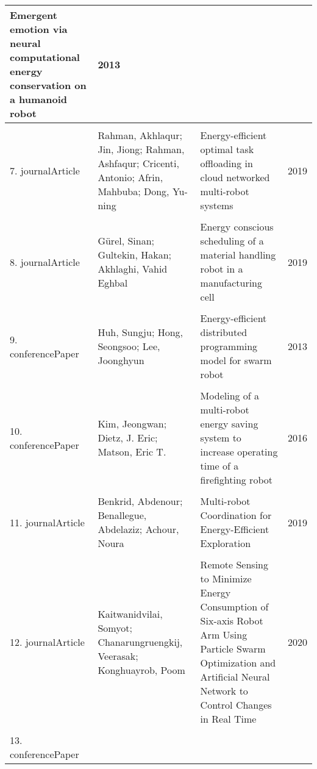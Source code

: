 \begin{table}[h]
\begin{tabular}{lp{5cm}p{9cm}c}
                {Emergent emotion via neural computational energy conservation on a humanoid robot} &
                {2013} \\
            \hline
            \\
            {7.}
                {journalArticle} &
                {Rahman, Akhlaqur; Jin, Jiong; Rahman, Ashfaqur; Cricenti, Antonio; Afrin, Mahbuba; Dong, Yu-ning} &
                {Energy-efficient optimal task offloading in cloud networked multi-robot systems} &
                {2019} \\ 
            \hline
            \\ 
            {8.}
                {journalArticle} &
                {Gürel, Sinan; Gultekin, Hakan; Akhlaghi, Vahid Eghbal} &
                {Energy conscious scheduling of a material handling robot in a manufacturing cell} &
                {2019} \\
            \hline
            \\
            {9.}
                {conferencePaper} &
                {Huh, Sungju; Hong, Seongsoo; Lee, Joonghyun} &
                {Energy-efficient distributed programming model for swarm robot} &
                {2013} \\    
            \hline
            \\
            {10.}
                {conferencePaper} &
                {Kim, Jeongwan; Dietz, J. Eric; Matson, Eric T.} &
                {Modeling of a multi-robot energy saving system to increase operating time of a firefighting robot} &
                {2016} \\
            \hline
            \\
            {11.}
                {journalArticle} &
                {Benkrid, Abdenour; Benallegue, Abdelaziz; Achour, Noura} &
                {Multi-robot Coordination for Energy-Efficient Exploration} &
                {2019} \\
            \hline
            \\
            {12.}
                {journalArticle} &
                {Kaitwanidvilai, Somyot; Chanarungruengkij, Veerasak; Konghuayrob, Poom} &
                {Remote Sensing to Minimize Energy Consumption of Six-axis Robot Arm Using Particle Swarm Optimization and Artificial Neural Network to Control Changes in Real Time} &
                {2020} \\
            \hline
            \\
            {13.}
                {conferencePaper} &

\end{tabular}
\end{table}
